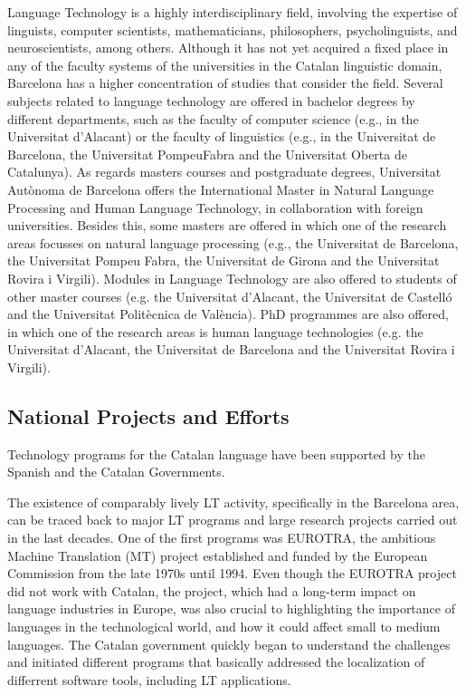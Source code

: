 \documentclass[]{../../metanetpaper}
\begin{document}
\begin{multicols}{2}
Language Technology is a highly interdisciplinary field, involving the expertise of linguists, computer scientists, mathematicians, philosophers, psycholinguists, and neuroscientists, among others. Although it has not yet acquired a fixed place in any of the faculty systems of the universities in the Catalan linguistic domain, Barcelona has a higher concentration of studies that consider the field. 
Several subjects related to language technology are offered in bachelor degrees by different departments, such as the faculty of computer science (e.g., in the Universitat d’Alacant) or the faculty of linguistics (e.g., in the Universitat de Barcelona, the Universitat PompeuFabra and the Universitat Oberta de Catalunya).
As regards masters courses and postgraduate degrees, Universitat Autònoma de Barcelona offers the International Master in Natural Language Processing and Human Language Technology, in collaboration with foreign universities. Besides this, some masters are offered in which one of the research areas focusses on natural language processing (e.g., the Universitat de Barcelona, the Universitat Pompeu Fabra, the Universitat de Girona and the Universitat Rovira i Virgili). Modules in Language Technology are also offered to students of other master courses (e.g. the Universitat d’Alacant, the Universitat de Castelló and the Universitat Politècnica de València). 
PhD programmes are also offered, in which one of the research areas is human language technologies (e.g. the Universitat d’Alacant, the Universitat de Barcelona and the Universitat Rovira i Virgili).

\subsection{National Projects and Efforts}

Technology programs for the Catalan language have been supported by the Spanish and the Catalan Governments.

The existence of comparably lively LT activity, specifically in the Barcelona area, can be traced back to major LT programs and large research projects carried out in the last decades. One of the first programs was EUROTRA, the ambitious Machine Translation (MT) project established and funded by the European Commission from the late 1970s until 1994. Even though the EUROTRA project did not work with Catalan, the project, which had a long-term impact on language industries in Europe, was also crucial to highlighting the importance of languages in the technological world, and how it could affect small to medium languages. The Catalan government quickly began to understand the challenges and initiated different programs that basically addressed the localization of differrent software tools, including LT applications. 


\end{multicols}
\end{document}
